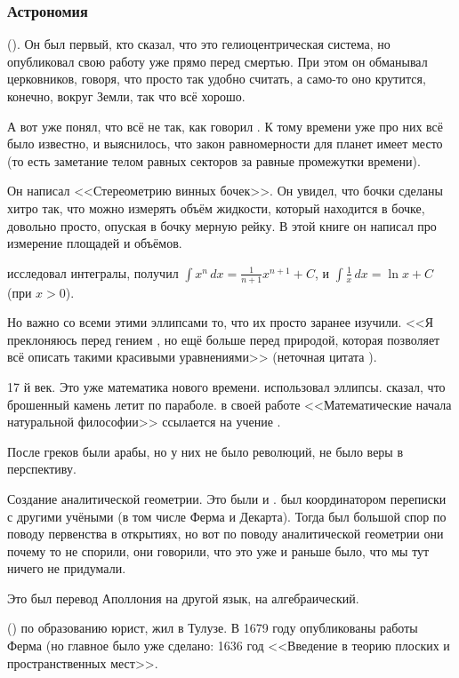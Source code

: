 \documentclass[a4paper,oneside,fleqn,10pt]{article}
\begin{document}
\subsubsection{Астрономия}

 (). Он был первый, кто сказал, что это гелиоцентрическая система,
но опубликовал свою работу уже прямо перед смертью.
При этом он обманывал церковников, говоря, что просто так удобно считать,
а само-то оно крутится, конечно, вокруг Земли, так что всё хорошо.

А вот  уже понял, что всё не так, как говорил .
К тому времени уже про них всё было известно, и выяснилось, что закон равномерности
для планет имеет место (то есть заметание телом равных секторов за равные
промежутки времени).

Он написал <<Стереометрию винных бочек>>. Он увидел, что бочки сделаны хитро так,
что можно измерять объём жидкости, который находится в бочке, довольно просто, опуская в бочку мерную рейку.
В этой книге он написал про измерение площадей и объёмов.

 исследовал интегралы, получил $\int x^n\,dx = \frac{1}{n+1} x^{n+1} + C$,
и $ \int \frac1x\,dx = \ln x + C$ (при $x > 0$).

Но важно со всеми этими эллипсами то, что их просто заранее изучили.
<<Я преклоняюсь перед гением , но ещё больше перед природой,
которая позволяет всё описать такими красивыми уравнениями>> (неточная цитата ).

17 й век. Это уже математика нового времени.  использовал эллипсы. 
сказал, что брошенный камень летит по параболе.  в своей работе
<<Математические начала натуральной философии>>
ссылается на учение .

После греков были арабы, но у них не было революций, не было веры в перспективу.

Создание аналитической геометрии. Это были  и .
 был координатором переписки с другими учёными (в том числе Ферма и Декарта).
Тогда был большой спор по поводу первенства в открытиях, но вот по поводу
аналитической геометрии они почему то не спорили, они говорили, что это уже и раньше было,
что мы тут ничего не придумали.

Это был перевод Аполлония на другой язык, на алгебраический.

 () по образованию юрист, жил в Тулузе.
В 1679 году опубликованы работы Ферма (но главное было уже сделано:
1636 год <<Введение в теорию плоских и пространственных мест>>.
\end{document}
